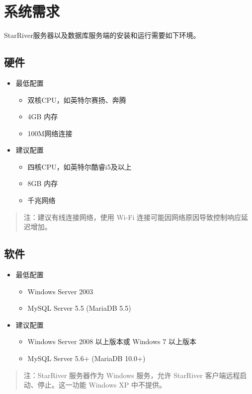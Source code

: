 \section{系统需求}\label{ux7cfbux7edfux9700ux6c42}

StarRiver服务器以及数据库服务端的安装和运行需要如下环境。

\subsection{硬件}\label{ux786cux4ef6}

\begin{itemize}
\itemsep1pt\parskip0pt
\item
  最低配置

  \begin{itemize}
  \itemsep1pt\parskip0pt
  \item
    双核CPU，如英特尔赛扬、奔腾
  \item
    4GB 内存
  \item
    100M网络连接
  \end{itemize}
\item
  建议配置

  \begin{itemize}
  \itemsep1pt\parskip0pt
  \item
    四核CPU，如英特尔酷睿i5及以上
  \item
    8GB 内存
  \item
    千兆网络
  \end{itemize}
\end{itemize}

\begin{quote}
注：建议有线连接网络，使用 Wi-Fi
连接可能因网络原因导致控制响应延迟增加。
\end{quote}

\subsection{软件}\label{ux8f6fux4ef6}

\begin{itemize}
\itemsep1pt\parskip0pt
\item
  最低配置

  \begin{itemize}
  \itemsep1pt\parskip0pt
  \item
    Windows Server 2003
  \item
    MySQL Server 5.5 (MariaDB 5.5)
  \end{itemize}
\item
  建议配置

  \begin{itemize}
  \itemsep1pt\parskip0pt
  \item
    Windows Server 2008 以上版本或 Windows 7 以上版本
  \item
    MySQL Server 5.6+ (MariaDB 10.0+)
  \end{itemize}
\end{itemize}

\begin{quote}
注：StarRiver 服务器作为 Windows 服务，允许 StarRiver
客户端远程启动、停止。这一功能 Windows XP 中不提供。
\end{quote}
